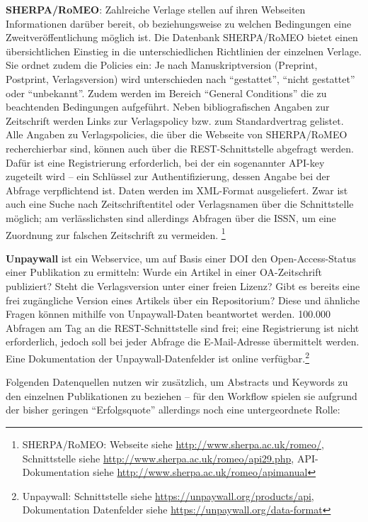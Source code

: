 \documentclass[a4paper,
fontsize=11pt,
oneside,
numbers=noperiodatend,
parskip=half-,
bibliography=totoc,
final
]{scrartcl}
\begin{document}
\textbf{SHERPA/RoMEO}: Zahlreiche Verlage stellen auf ihren Webseiten
Informationen darüber bereit, ob beziehungsweise zu welchen Bedingungen
eine Zweitveröffentlichung möglich ist. Die Datenbank SHERPA/RoMEO
bietet einen übersichtlichen Einstieg in die unterschiedlichen
Richtlinien der einzelnen Verlage. Sie ordnet zudem die Policies ein: Je
nach Manuskriptversion (Preprint, Postprint, Verlagsversion) wird
unterschieden nach \enquote{gestattet}, \enquote{nicht gestattet} oder
\enquote{unbekannt}. Zudem werden im Bereich \enquote{General
Conditions} die zu beachtenden Bedingungen aufgeführt. Neben
bibliografischen Angaben zur Zeitschrift werden Links zur Verlagspolicy
bzw. zum Standardvertrag gelistet. Alle Angaben zu Verlagspolicies, die
über die Webseite von SHERPA/RoMEO recherchierbar sind, können auch über
die REST-Schnittstelle abgefragt werden. Dafür ist eine Registrierung
erforderlich, bei der ein sogenannter API-key zugeteilt wird -- ein
Schlüssel zur Authentifizierung, dessen Angabe bei der Abfrage
verpflichtend ist. Daten werden im XML-Format ausgeliefert. Zwar ist
auch eine Suche nach Zeitschriftentitel oder Verlagsnamen über die
Schnittstelle möglich; am verlässlichsten sind allerdings Abfragen über
die ISSN, um eine Zuordnung zur falschen Zeitschrift zu vermeiden.
\footnote{SHERPA/RoMEO: Webseite siehe
  \url{http://www.sherpa.ac.uk/romeo/}, Schnittstelle siehe
  \url{http://www.sherpa.ac.uk/romeo/api29.php}, API-Dokumentation siehe
  \url{http://www.sherpa.ac.uk/romeo/apimanual}}

\textbf{Unpaywall} ist ein Webservice, um auf Basis einer DOI den
Open-Access-Status einer Publikation zu ermitteln: Wurde ein Artikel in
einer OA-Zeitschrift publiziert? Steht die Verlagsversion unter einer
freien Lizenz? Gibt es bereits eine frei zugängliche Version eines
Artikels über ein Repositorium? Diese und ähnliche Fragen können
mithilfe von Unpaywall-Daten beantwortet werden. 100.000 Abfragen am Tag
an die REST-Schnittstelle sind frei; eine Registrierung ist nicht
erforderlich, jedoch soll bei jeder Abfrage die E-Mail-Adresse
übermittelt werden. Eine Dokumentation der Unpaywall-Datenfelder ist
online verfügbar.\footnote{Unpaywall: Schnittstelle siehe
  \url{https://unpaywall.org/products/api}, Dokumentation Datenfelder
  siehe \url{https://unpaywall.org/data-format}}

Folgenden Datenquellen nutzen wir zusätzlich, um Abstracts und Keywords
zu den einzelnen Publikationen zu beziehen -- für den Workflow spielen
sie aufgrund der bisher geringen \enquote{Erfolgsquote} allerdings noch
eine untergeordnete Rolle:
\end{document}
